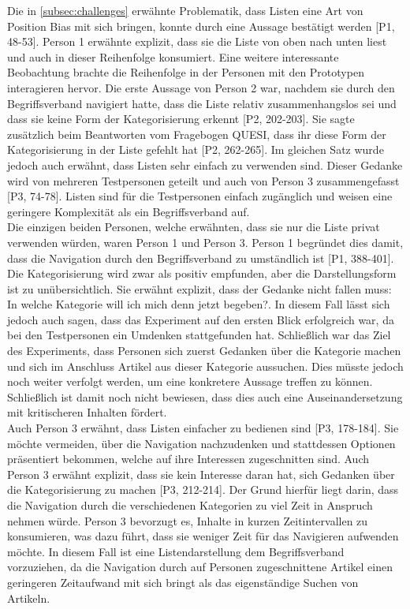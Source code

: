 Die in \autoref{subsec:challenges} erwähnte Problematik, dass Listen eine Art von Position Bias mit sich bringen, konnte durch eine Aussage bestätigt werden [P1, 48-53].
Person 1 erwähnte explizit, dass sie die Liste von oben nach unten liest und auch in dieser Reihenfolge konsumiert.
Eine weitere interessante Beobachtung brachte die Reihenfolge in der Personen mit den Prototypen interagieren hervor.
Die erste Aussage von Person 2 war, nachdem sie durch den Begriffsverband navigiert hatte, dass die Liste \glqq relativ zusammenhangslos\grqq{} sei und dass sie keine Form der Kategorisierung erkennt [P2, 202-203].
Sie sagte zusätzlich beim Beantworten vom Fragebogen \ac{QUESI}, dass ihr diese Form der Kategorisierung in der Liste gefehlt hat [P2, 262-265].
Im gleichen Satz wurde jedoch auch erwähnt, dass Listen sehr einfach zu verwenden sind.
Dieser Gedanke wird von mehreren Testpersonen geteilt und auch von Person 3 zusammengefasst [P3, 74-78].
Listen sind für die Testpersonen einfach zugänglich und weisen eine geringere Komplexität als ein Begriffsverband auf.\\

Die einzigen beiden Personen, welche erwähnten, dass sie nur die Liste privat verwenden würden, waren Person 1 und Person 3.
Person 1 begründet dies damit, dass die Navigation durch den Begriffsverband zu umständlich ist [P1, 388-401].
Die Kategorisierung wird zwar als positiv empfunden, aber die Darstellungsform ist zu unübersichtlich.
Sie erwähnt explizit, dass der Gedanke nicht fallen muss: \glqq In welche Kategorie will ich mich denn jetzt begeben?\grqq{}.
In diesem Fall lässt sich jedoch auch sagen, dass das Experiment auf den ersten Blick erfolgreich war, da bei den Testpersonen ein Umdenken stattgefunden hat.
Schließlich war das Ziel des Experiments, dass Personen sich zuerst Gedanken über die Kategorie machen und sich im Anschluss Artikel aus dieser Kategorie aussuchen.
Dies müsste jedoch noch weiter verfolgt werden, um eine konkretere Aussage treffen zu können.
Schließlich ist damit noch nicht bewiesen, dass dies auch eine Auseinandersetzung mit kritischeren Inhalten fördert.\\

Auch Person 3 erwähnt, dass Listen einfacher zu bedienen sind [P3, 178-184].
Sie möchte vermeiden, über die Navigation nachzudenken und stattdessen Optionen präsentiert bekommen, welche auf ihre Interessen zugeschnitten sind.
Auch Person 3 erwähnt explizit, dass sie kein Interesse daran hat, sich Gedanken über die Kategorisierung zu machen [P3, 212-214].
Der Grund hierfür liegt darin, dass die Navigation durch die verschiedenen Kategorien zu viel Zeit in Anspruch nehmen würde.
Person 3 bevorzugt es, Inhalte in kurzen Zeitintervallen zu konsumieren, was dazu führt, dass sie weniger Zeit für das Navigieren aufwenden möchte.
In diesem Fall ist eine Listendarstellung dem Begriffsverband vorzuziehen, da die Navigation durch auf Personen zugeschnittene Artikel einen geringeren Zeitaufwand mit sich bringt als das eigenständige Suchen von Artikeln.

